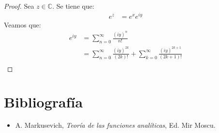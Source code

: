 \documentclass[12pt]{report}
\theoremstyle{largebreak}
\begin{document}
    \begin{proof}
        Sea $z\in\mathbb{C}$. Se tiene que:
        \begin{equation*}
            \begin{split}
                e^z&=e^{x}e^{iy}
            \end{split}
        \end{equation*}
        Veamos que:
        \begin{equation*}
            \begin{split}
                e^{ iy}&=\sum_{n=0}^\infty\frac{(iy)^n}{n!}\\
                &=\sum_{n=0}^\infty\frac{(iy)^{2k}}{(2k)!}+\sum_{k=0}^\infty\frac{(iy)^{2k+1}}{(2k+1)!}\\
            \end{split}
        \end{equation*}
    \end{proof}



    \chapter*{Bibliografía}

    \begin{itemize}
        \item A. Markusevich, \textit{Teoría de las funciones analíticas}, Ed. Mir Moscu.
    \end{itemize}
    
\end{document}
